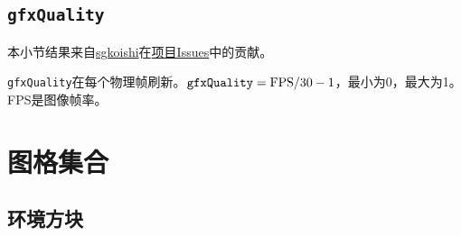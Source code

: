 \subsection{\lstinline{gfxQuality}}\label{app34}
\begin{note}
本小节结果来自\href{https://github.com/sgkoishi}{sgkoishi}在\href{https://github.com/putianyi889/TerrariaWiringTutorial/issues/11#issuecomment-544567689}{项目Issues}中的贡献。
\end{note}
\lstinline{gfxQuality}在每个物理帧刷新。$\mathtt{gfxQuality}=\textnormal{FPS}/30-1$，最小为0，最大为1。FPS是图像帧率。

\section{图格集合}
\subsection{环境方块}
